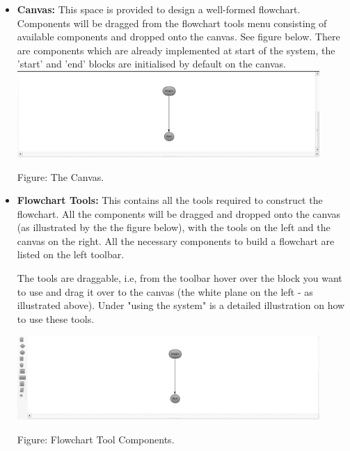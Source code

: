 \documentclass[11pt,a4paper,titlepage]{article}
\begin{document}
		
		\begin{itemize}
			\item \textbf{Canvas:} This space is provided to design a 			well-formed flowchart. Components will be dragged from the flowchart 				tools menu consisting of available components and dropped onto the 				canvas. See figure below.\newline
			There are components which are already implemented at start of the system, the 'start' and 'end' blocks are initialised by default on the canvas.\newline \newline
			\includegraphics[width=11.5cm]{images/Canvas.jpg}
			\begin{center}
		Figure: The Canvas.\newline
		\end{center}
			
			\item \textbf{Flowchart Tools:} This contains all the tools required to construct the flowchart. All the components will be dragged and dropped onto the canvas (as illustrated by the the figure below), with the tools on the left and the canvas on the right. All the necessary components to build a flowchart are listed on the left toolbar.\newline
			
		The tools are draggable, i.e, from the toolbar hover over the block you want to use and drag it over to the canvas (the white plane on the left - as illustrated above). Under "using the system" is a detailed illustration on how to use these tools. \newline \newline			
			
			\includegraphics[width=11.5cm]{images/Tools.jpg}
			\begin{center}
		Figure: Flowchart Tool Components.\newline
		\end{center} 
			

\end{itemize}
\end{document}
